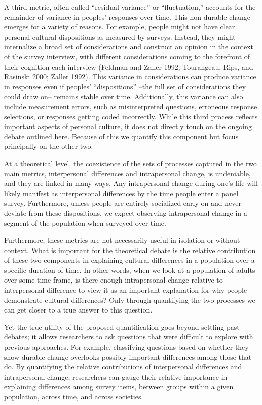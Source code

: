 \documentclass[
  12pt,
]{article}
\begin{document}
A third metric, often called ``residual variance'' or ``fluctuation,''
accounts for the remainder of variance in peoples' responses over time.
This non-durable change emerges for a variety of reasons. For example,
people might not have clear personal cultural dispositions as measured
by surveys. Instead, they might internalize a broad set of
considerations and construct an opinion in the context of the survey
interview, with different considerations coming to the forefront of
their cognition each interview (Feldman and Zaller 1992; Tourangeau,
Rips, and Rasinski 2000; Zaller 1992). This variance in considerations
can produce variance in responses even if peoples' ``dispositions''
--the full set of considerations they could draw on-- remains stable
over time. Additionally, this variance can also include measurement
errors, such as misinterpreted questions, erroneous response selections,
or responses getting coded incorrectly. While this third process
reflects important aspects of personal culture, it does not directly
touch on the ongoing debate outlined here. Because of this we quantify
this component but focus principally on the other two.

At a theoretical level, the coexistence of the sets of processes
captured in the two main metrics, interpersonal differences and
intrapersonal change, is undeniable, and they are linked in many ways.
Any intrapersonal change during one's life will likely manifest as
interpersonal differences by the time people enter a panel survey.
Furthermore, unless people are entirely socialized early on and never
deviate from these dispositions, we expect observing intrapersonal
change in a segment of the population when surveyed over time.

Furthermore, these metrics are not necessarily useful in isolation or
without context. What is important for the theoretical debate is the
relative contribution of these two components in explaining cultural
differences in a population over a specific duration of time. In other
words, when we look at a population of adults over some time frame, is
there enough intrapersonal change relative to interpersonal difference
to view it as an important explanation for why people demonstrate
cultural differences? Only through quantifying the two processes we can
get closer to a true answer to this question.

Yet the true utility of the proposed quantification goes beyond settling
past debates; it allows researchers to ask questions that were difficult
to explore with previous approaches. For example, classifying questions
based on whether they show durable change overlooks possibly important
differences among those that do. By quantifying the relative
contributions of interpersonal differences and intrapersonal change,
researchers can gauge their relative importance in explaining
differences among survey items, between groups within a given
population, across time, and across societies.
\end{document}
